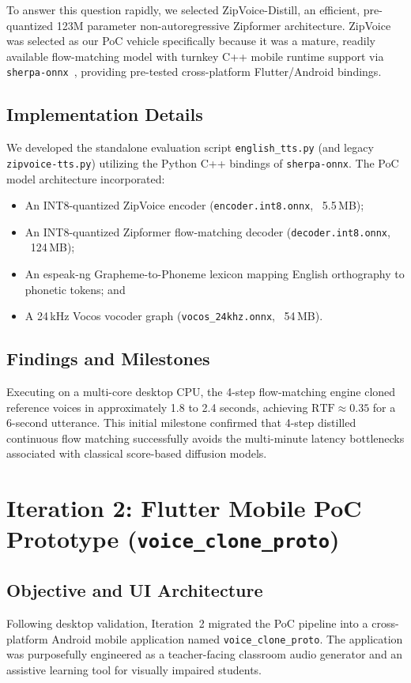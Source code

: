 To answer this question rapidly, we selected ZipVoice-Distill, an efficient, pre-quantized 123M parameter non-autoregressive Zipformer architecture. ZipVoice was selected as our PoC vehicle specifically because it was a mature, readily available flow-matching model with turnkey C++ mobile runtime support via \texttt{sherpa-onnx}~\cite{sherpaonnx2023}, providing pre-tested cross-platform Flutter/Android bindings.

\subsection{Implementation Details}
We developed the standalone evaluation script \texttt{english\_tts.py} (and legacy \texttt{zipvoice-tts.py}) utilizing the Python C++ bindings of \texttt{sherpa-onnx}. The PoC model architecture incorporated:
\begin{itemize}
    \item An INT8-quantized ZipVoice encoder (\texttt{encoder.int8.onnx}, ~5.5\,MB);
    \item An INT8-quantized Zipformer flow-matching decoder (\texttt{decoder.int8.onnx}, ~124\,MB);
    \item An espeak-ng Grapheme-to-Phoneme lexicon mapping English orthography to phonetic tokens; and
    \item A 24\,kHz Vocos vocoder graph (\texttt{vocos\_24khz.onnx}, ~54\,MB).
\end{itemize}

\subsection{Findings and Milestones}
Executing on a multi-core desktop CPU, the 4-step flow-matching engine cloned reference voices in approximately 1.8 to 2.4 seconds, achieving $\text{RTF} \approx 0.35$ for a 6-second utterance. This initial milestone confirmed that 4-step distilled continuous flow matching successfully avoids the multi-minute latency bottlenecks associated with classical score-based diffusion models.

\section{Iteration 2: Flutter Mobile PoC Prototype (\texorpdfstring{\texttt{voice\_clone\_proto}}{voice\_clone\_proto})}
\subsection{Objective and UI Architecture}
Following desktop validation, Iteration~2 migrated the PoC pipeline into a cross-platform Android mobile application named \texttt{voice\_clone\_proto}. The application was purposefully engineered as a teacher-facing classroom audio generator and an assistive learning tool for visually impaired students.

